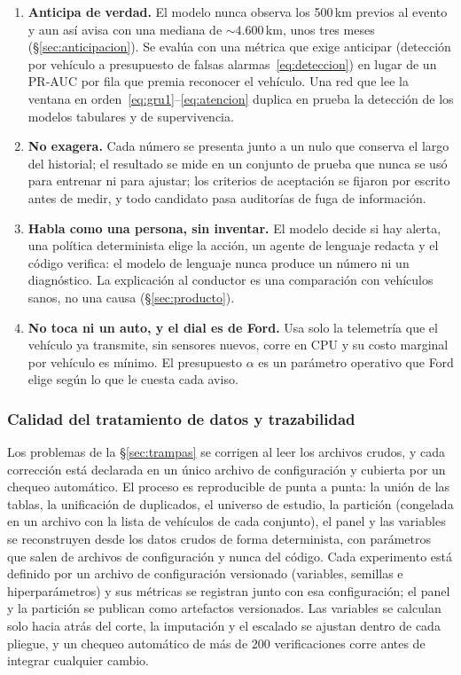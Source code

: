 \begin{enumerate}
  \item \textbf{Anticipa de verdad.} El modelo nunca observa los 500\,km previos al evento y aun así avisa con una mediana
    de $\sim 4.600$\,km, unos tres meses (\S\ref{sec:anticipacion}). Se evalúa con una métrica que exige anticipar
    (detección por vehículo a presupuesto de falsas alarmas~\eqref{eq:deteccion}) en lugar de un PR-AUC por fila que premia
    reconocer el vehículo. Una red que lee la ventana en orden~\eqref{eq:gru1}--\eqref{eq:atencion} duplica en prueba la
    detección de los modelos tabulares y de supervivencia.
  \item \textbf{No exagera.} Cada número se presenta junto a un nulo que conserva el largo del historial; el resultado se mide
    en un conjunto de prueba que nunca se usó para entrenar ni para ajustar; los criterios de aceptación se fijaron por
    escrito antes de medir, y todo candidato pasa auditorías de fuga de información.
  \item \textbf{Habla como una persona, sin inventar.} El modelo decide si hay alerta, una política determinista elige la
    acción, un agente de lenguaje redacta y el código verifica: el modelo de lenguaje nunca produce un número ni un
    diagnóstico. La explicación al conductor es una comparación con vehículos sanos, no una causa (\S\ref{sec:producto}).
  \item \textbf{No toca ni un auto, y el dial es de Ford.} Usa solo la telemetría que el vehículo ya transmite, sin sensores
    nuevos, corre en CPU y su costo marginal por vehículo es mínimo. El presupuesto $\alpha$ es un parámetro operativo que
    Ford elige según lo que le cuesta cada aviso.
\end{enumerate}

\subsubsection{Calidad del tratamiento de datos y trazabilidad}
\label{sec:calidad}

Los problemas de la \S\ref{sec:trampas} se corrigen al leer los archivos crudos, y cada corrección está declarada en un único
archivo de configuración y cubierta por un chequeo automático. El proceso es reproducible de punta a punta: la unión de las
tablas, la unificación de duplicados, el universo de estudio, la partición (congelada en un archivo con la lista de vehículos
de cada conjunto), el panel y las variables se reconstruyen desde los datos crudos de forma determinista, con parámetros que
salen de archivos de configuración y nunca del código. Cada experimento está definido por un archivo de configuración
versionado (variables, semillas e hiperparámetros) y sus métricas se registran junto con esa configuración; el panel y la
partición se publican como artefactos versionados. Las variables se calculan solo hacia atrás del corte, la imputación y el escalado se ajustan dentro de cada
pliegue, y un chequeo automático de más de 200 verificaciones corre antes de integrar cualquier cambio.

